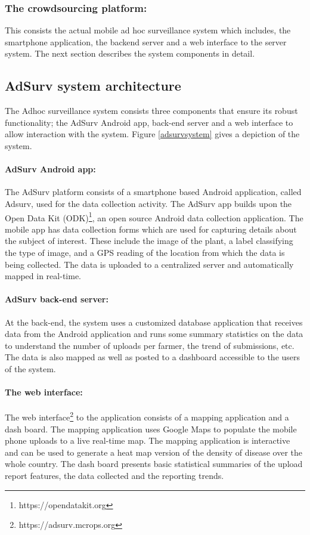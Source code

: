 \documentclass[letterpaper]{article} %
\begin{document}
\subsubsection{The crowdsourcing platform:}
This consists the actual mobile ad hoc surveillance system which includes, the smartphone application, the backend server and a web interface to the server system. The next section describes the system components in detail.

\subsection{AdSurv system architecture}
The Adhoc surveillance system consists three components that ensure its robust functionality; the AdSurv Android app, back-end server and a web interface to allow interaction with the system. Figure \ref{adsurvsystem} gives a depiction of the system.

\paragraph{AdSurv Android app:} 
The AdSurv platform consists of a smartphone based Android application, called Adsurv, used for the data collection activity. The AdSurv app builds upon the Open Data Kit (ODK)\footnote{https://opendatakit.org}, an open source Android data collection application. The mobile app has data collection forms which are used for capturing details about the subject of interest. These include the image of the plant, a label classifying the type of image, and a GPS reading of the location from which the data is being collected. The data is uploaded to a centralized server and automatically mapped in real-time.

\paragraph{AdSurv back-end server:}
At the back-end, the system uses a customized database application that receives data from the Android application and runs some summary statistics on the data to understand the number of uploads per farmer, the trend of submissions, etc. The data is also mapped as well as posted to a dashboard accessible to the users of the system. 

\paragraph{The web interface: } 
The web interface\footnote{https://adsurv.mcrops.org} to the application consists of a mapping application and a dash board. The mapping application uses Google Maps to populate the mobile phone uploads to a live real-time map. The mapping application is interactive and can be used to generate a heat map version of the density of disease over the whole country. The dash board presents basic statistical summaries of the upload report features, the data collected and the reporting trends. 
\end{document}
